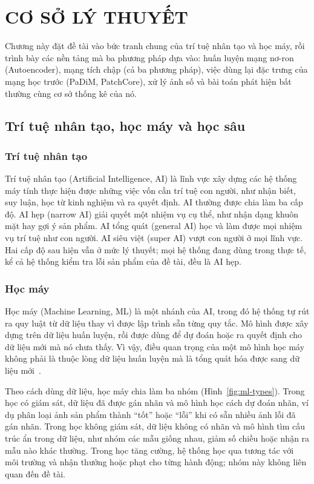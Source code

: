 \chapter{CƠ SỞ LÝ THUYẾT}

Chương này đặt đề tài vào bức tranh chung của trí tuệ nhân tạo và học máy, rồi trình bày các nền tảng mà ba phương
pháp dựa vào: huấn luyện mạng nơ-ron (Autoencoder), mạng tích chập (cả ba phương pháp), việc dùng lại đặc trưng của
mạng học trước (PaDiM, PatchCore), xử lý ảnh số và bài toán phát hiện bất thường cùng cơ sở thống kê của nó.

\section{Trí tuệ nhân tạo, học máy và học sâu}

\subsection{Trí tuệ nhân tạo}

Trí tuệ nhân tạo (Artificial Intelligence, AI) là lĩnh vực xây dựng các hệ thống máy tính thực hiện được những việc
vốn cần trí tuệ con người, như nhận biết, suy luận, học từ kinh nghiệm và ra quyết định. AI thường được chia làm ba
cấp độ. AI hẹp (narrow AI) giải quyết một nhiệm vụ cụ thể, như nhận dạng khuôn mặt hay gợi ý sản phẩm. AI tổng quát
(general AI) học và làm được mọi nhiệm vụ trí tuệ như con người. AI siêu việt (super AI) vượt con người ở mọi lĩnh
vực. Hai cấp độ sau hiện vẫn ở mức lý thuyết; mọi hệ thống đang dùng trong thực tế, kể cả hệ thống kiểm tra lỗi sản
phẩm của đề tài, đều là AI hẹp.

\subsection{Học máy}

Học máy (Machine Learning, ML) là một nhánh của AI, trong đó hệ thống tự rút ra quy luật từ dữ liệu thay vì được lập
trình sẵn từng quy tắc. Mô hình được xây dựng trên dữ liệu huấn luyện, rồi được dùng để dự đoán hoặc ra quyết định
cho dữ liệu mới mà nó chưa thấy. Vì vậy, điều quan trọng của một mô hình học máy không phải là thuộc lòng dữ liệu
huấn luyện mà là tổng quát hóa được sang dữ liệu mới~\cite{zhangGeneralization}.

Theo cách dùng dữ liệu, học máy chia làm ba nhóm (Hình~\ref{fig:ml-types}). Trong học có giám sát, dữ liệu đã được
gán nhãn và mô hình học cách dự đoán nhãn, ví dụ phân loại ảnh sản phẩm thành ``tốt'' hoặc ``lỗi'' khi có sẵn nhiều
ảnh lỗi đã gán nhãn. Trong học không giám sát, dữ liệu không có nhãn và mô hình tìm cấu trúc ẩn trong dữ liệu, như
nhóm các mẫu giống nhau, giảm số chiều hoặc nhận ra mẫu nào khác thường. Trong học tăng cường, hệ thống học qua tương
tác với môi trường và nhận thưởng hoặc phạt cho từng hành động; nhóm này không liên quan đến đề tài.


